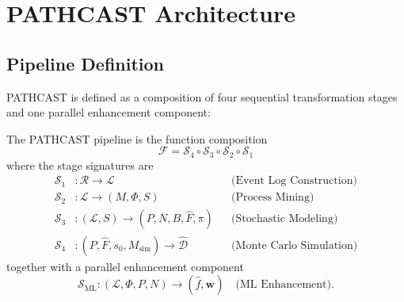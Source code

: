 
\section{PATHCAST Architecture}
\label{sec:architecture}

\subsection{Pipeline Definition}
\label{sec:arch-pipeline}

PATHCAST is defined as a composition of four sequential transformation
stages and one parallel enhancement component:

\begin{definition}
\label{def:pipeline}
The PATHCAST pipeline is the function composition
\begin{equation}
\label{eq:pipeline}
\mathcal{F} = \mathcal{S}_4 \circ \mathcal{S}_3 \circ \mathcal{S}_2 \circ \mathcal{S}_1
\end{equation}
where the stage signatures are
\begin{align}
\mathcal{S}_1 &: \mathcal{R} \to \mathcal{L}
    && \text{(Event Log Construction)} \label{eq:stage1-sig} \\
\mathcal{S}_2 &: \mathcal{L} \to (M, \Phi, S)
    && \text{(Process Mining)} \label{eq:stage2-sig} \\
\mathcal{S}_3 &: (\mathcal{L}, S) \to (P, N, B, \hat{F}, \pi)
    && \text{(Stochastic Modeling)} \label{eq:stage3-sig} \\
\mathcal{S}_4 &: (P, \hat{F}, s_0, M_{\text{sim}}) \to \hat{\mathcal{D}}
    && \text{(Monte Carlo Simulation)} \label{eq:stage4-sig}
\end{align}
together with a parallel enhancement component
\begin{equation}
\label{eq:ml-sig}
\mathcal{S}_{\text{ML}} : (\mathcal{L}, \Phi, P, N) \to (\hat{f}, \mathbf{w})
\quad \text{(ML Enhancement)}.
\end{equation}
\end{definition}

